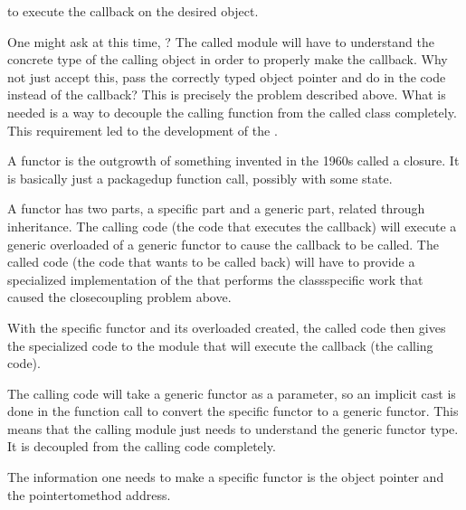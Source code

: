 \documentclass[letterpaper,10pt,english]{sphinxmanual}
\renewcommand{\sphinxcode}[1]{\texttt{\small{#1}}}
\begin{document}
\begin{sphinxVerbatim}[commandchars=\\\{\}]
 
\end{sphinxVerbatim}

to execute the callback on the desired object.

One might ask at this time, ? The called module will have to
understand the concrete type of the calling object in order to properly make the
callback. Why not just accept this, pass the correctly typed object pointer and
do \sphinxcode{\sphinxupquote{object\sphinxhyphen{}\textgreater{}Method(1234)}} in the code instead of the callback?  This is
precisely the problem described above. What is needed is a way to decouple the
calling function from the called class completely. This requirement led to the
development of the .

A functor is the outgrowth of something invented in the 1960s called a closure.
It is basically just a packaged\sphinxhyphen{}up function call, possibly with some state.

A functor has two parts, a specific part and a generic part, related through
inheritance. The calling code (the code that executes the callback) will execute
a generic overloaded \sphinxcode{} of a generic functor to cause the callback
to be called. The called code (the code that wants to be called back) will have
to provide a specialized implementation of the \sphinxcode{} that performs the
class\sphinxhyphen{}specific work that caused the close\sphinxhyphen{}coupling problem above.

With the specific functor and its overloaded \sphinxcode{} created, the called
code then gives the specialized code to the module that will execute the
callback (the calling code).

The calling code will take a generic functor as a parameter, so an implicit cast
is done in the function call to convert the specific functor to a generic
functor.  This means that the calling module just needs to understand the
generic functor type. It is decoupled from the calling code completely.

The information one needs to make a specific functor is the object pointer and
the pointer\sphinxhyphen{}to\sphinxhyphen{}method address.
\end{document}
